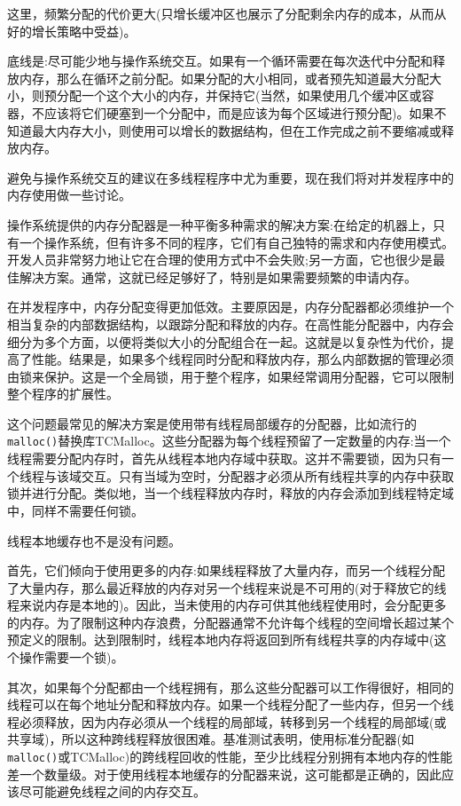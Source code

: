 这里，频繁分配的代价更大(只增长缓冲区也展示了分配剩余内存的成本，从而从好的增长策略中受益)。 

底线是:尽可能少地与操作系统交互。如果有一个循环需要在每次迭代中分配和释放内存，那么在循环之前分配。如果分配的大小相同，或者预先知道最大分配大小，则预分配一个这个大小的内存，并保持它(当然，如果使用几个缓冲区或容器，不应该将它们硬塞到一个分配中，而是应该为每个区域进行预分配)。如果不知道最大内存大小，则使用可以增长的数据结构，但在工作完成之前不要缩减或释放内存。 

避免与操作系统交互的建议在多线程程序中尤为重要，现在我们将对并发程序中的内存使用做一些讨论。


操作系统提供的内存分配器是一种平衡多种需求的解决方案:在给定的机器上，只有一个操作系统，但有许多不同的程序，它们有自己独特的需求和内存使用模式。开发人员非常努力地让它在合理的使用方式中不会失败;另一方面，它也很少是最佳解决方案。通常，这就已经足够好了，特别是如果需要频繁的申请内存。

在并发程序中，内存分配变得更加低效。主要原因是，内存分配器都必须维护一个相当复杂的内部数据结构，以跟踪分配和释放的内存。在高性能分配器中，内存会细分为多个方面，以便将类似大小的分配组合在一起。这就是以复杂性为代价，提高了性能。结果是，如果多个线程同时分配和释放内存，那么内部数据的管理必须由锁来保护。这是一个全局锁，用于整个程序，如果经常调用分配器，它可以限制整个程序的扩展性。

这个问题最常见的解决方案是使用带有线程局部缓存的分配器，比如流行的\texttt{malloc()}替换库TCMalloc。这些分配器为每个线程预留了一定数量的内存:当一个线程需要分配内存时，首先从线程本地内存域中获取。这并不需要锁，因为只有一个线程与该域交互。只有当域为空时，分配器才必须从所有线程共享的内存中获取锁并进行分配。类似地，当一个线程释放内存时，释放的内存会添加到线程特定域中，同样不需要任何锁。

线程本地缓存也不是没有问题。

首先，它们倾向于使用更多的内存:如果线程释放了大量内存，而另一个线程分配了大量内存，那么最近释放的内存对另一个线程来说是不可用的(对于释放它的线程来说内存是本地的)。因此，当未使用的内存可供其他线程使用时，会分配更多的内存。为了限制这种内存浪费，分配器通常不允许每个线程的空间增长超过某个预定义的限制。达到限制时，线程本地内存将返回到所有线程共享的内存域中(这个操作需要一个锁)。

其次，如果每个分配都由一个线程拥有，那么这些分配器可以工作得很好，相同的线程可以在每个地址分配和释放内存。如果一个线程分配了一些内存，但另一个线程必须释放，因为内存必须从一个线程的局部域，转移到另一个线程的局部域(或共享域)，所以这种跨线程释放很困难。基准测试表明，使用标准分配器(如\texttt{malloc()}或TCMalloc)的跨线程回收的性能，至少比线程分别拥有本地内存的性能差一个数量级。对于使用线程本地缓存的分配器来说，这可能都是正确的，因此应该尽可能避免线程之间的内存交互。


